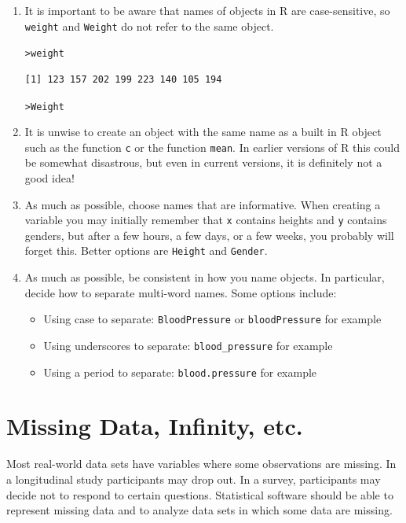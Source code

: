 \documentclass[12pt,oneside]{book}\usepackage[]{graphicx}\usepackage[]{color}
\makeatletter
\newcommand{\hlstd}[1]{\textcolor[rgb]{0.345,0.345,0.345}{#1}}%
\newenvironment{kframe}{%
 \def\at@end@of@kframe{}%
 \ifinner\ifhmode%
  \def\at@end@of@kframe{\end{minipage}}%
  \begin{minipage}{\columnwidth}%
 \fi\fi%
 \def\FrameCommand##1{\hskip\@totalleftmargin \hskip-\fboxsep
 \colorbox{shadecolor}{##1}\hskip-\fboxsep
     \hskip-\linewidth \hskip-\@totalleftmargin \hskip\columnwidth}%
 \MakeFramed {\advance\hsize-\width
   \@totalleftmargin\z@ \linewidth\hsize
   \@setminipage}}%
 {\par\unskip\endMakeFramed%
 \at@end@of@kframe}
\newenvironment{knitrout}{}{} %
\makeatother
\begin{document}
\begin{enumerate}
\item It is important to be aware that names of objects in R are case-sensitive, so \verb+weight+ and \verb+Weight+ do not refer to the same object. 
\begin{knitrout}
\color{fgcolor}\begin{kframe}
\begin{alltt}
\hlstd{> }\hlstd{weight}
\end{alltt}
\begin{verbatim}
[1] 123 157 202 199 223 140 105 194
\end{verbatim}
\begin{alltt}
\hlstd{> }\hlstd{Weight}
\end{alltt}


{\ttfamily\noindent\bfseries\color{errorcolor}{Error in eval(expr, envir, enclos): object 'Weight' not found}}\end{kframe}
\end{knitrout}
\item It is unwise to create an object with the same name as a built in R object such as the function \verb+c+ or the function \verb+mean+. In earlier versions of R this could be somewhat disastrous, but even in current versions, it is definitely not a good idea!
\item As much as possible, choose names that are informative. When creating a variable you may initially remember that \verb+x+ contains heights and \verb+y+ contains genders, but after a few hours, a few days, or a few weeks, you probably will forget this. Better options are \verb+Height+ and \verb+Gender+.
\item As much as possible, be consistent in how you name objects. In particular, decide how to separate multi-word names. Some options include:
\begin{itemize}
\item Using case to separate: \verb+BloodPressure+ or \verb+bloodPressure+ for example
\item Using underscores to separate: \verb+blood_pressure+ for example
\item Using a period to separate: \verb+blood.pressure+ for example
\end{itemize}
\end{enumerate}

\section{Missing Data, Infinity, etc.}
Most real-world data sets have variables where some observations are missing. In a longitudinal study participants may drop out. In a survey, participants may decide not to respond to certain questions. Statistical software should be able to represent missing data and to analyze data sets in which some data are missing.
\end{document}
